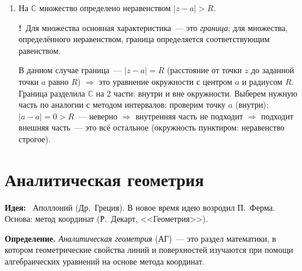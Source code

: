 \documentclass[a4paper,11pt]{article}
\newcommand{\lead}[1]{\textbf{\color{leadcol}#1}\ }
\newcommand{\imp}{\textbf{\color{red!70!black}!}\ }
\begin{document}
\begin{enumerate}[label=\arabic*.]
\item На $\mathbb C$ множество определено неравенством $|z-a|>R$.

\imp Для множества основная характеристика~--- это \emph{граница}; для множества, определённого
неравенством, граница определяется соответствующим равенством.

\begin{minipage}[c]{0.55\linewidth}
В данном случае граница~--- $|z-a|=R$ (расстояние от точки $z$ до заданной точки $a$ равно $R$)
$\Rightarrow$ это уравнение окружности с центром $a$ и радиусом $R$. Граница разделила $\mathbb C$
на 2 части: внутри и вне окружности. Выберем нужную часть по аналогии с методом интервалов:
проверим точку $a$ (внутри): $|a-a|=0>R$~--- неверно $\Rightarrow$ внутренняя часть не подходит
$\Rightarrow$ подходит внешняя часть~--- это всё остальное (окружность пунктиром: неравенство
строгое).
\end{minipage}\hfill
\begin{minipage}[c]{0.41\linewidth}
\centering
{}
\end{minipage}
\end{enumerate}

\section{Аналитическая геометрия}
\lead{Идея:} Аполлоний (Др.~Греция). В новое время идею возродил П.~Ферма.
Основа: метод координат (Р.~Декарт, <<Геометрия>>).

\begin{opr}
\textbf{Определение.} \emph{Аналитическая геометрия} (АГ)~--- это раздел математики, в котором
геометрические свойства линий и поверхностей изучаются при помощи алгебраических уравнений на
основе метода координат.
\end{opr}
\end{document}
